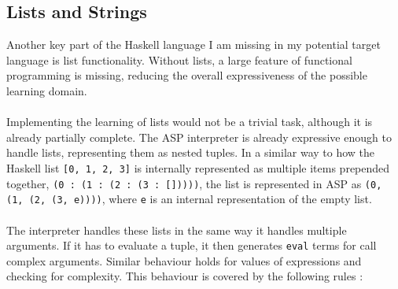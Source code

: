 \subsection{Lists and Strings}
Another key part of the Haskell language I am missing in my potential target language is list functionality. Without lists, a large feature of functional programming is missing, reducing the overall expressiveness of the possible learning domain. \\ \\
Implementing the learning of lists would not be a trivial task, although it is already partially complete. The ASP interpreter is already expressive enough to handle lists, representing them as nested tuples. In a similar way to how the Haskell list \lstinline{[0, 1, 2, 3]} is internally represented as multiple items prepended together, \lstinline{(0 : (1 : (2 : (3 : []))))}, the list is represented in ASP as \lstinline{(0, (1, (2, (3, e))))}, where \lstinline{e} is an internal representation of the empty list. \\ \\
The interpreter handles these lists in the same way it handles multiple arguments. If it has to evaluate a tuple, it then generates \lstinline{eval} terms for call complex arguments. Similar behaviour holds for values of expressions and checking for complexity. This behaviour is covered by the following rules : \\ %

